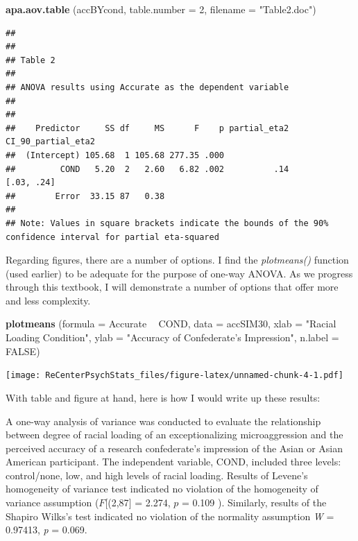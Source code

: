 \documentclass[
  english,
]{book}
\newenvironment{Shaded}{\begin{snugshade}}{\end{snugshade}}
\newcommand{\DataTypeTok}[1]{\textcolor[rgb]{0.13,0.29,0.53}{#1}}
\newcommand{\DecValTok}[1]{\textcolor[rgb]{0.00,0.00,0.81}{#1}}
\newcommand{\KeywordTok}[1]{\textcolor[rgb]{0.13,0.29,0.53}{\textbf{#1}}}
\newcommand{\NormalTok}[1]{#1}
\newcommand{\OperatorTok}[1]{\textcolor[rgb]{0.81,0.36,0.00}{\textbf{#1}}}
\newcommand{\OtherTok}[1]{\textcolor[rgb]{0.56,0.35,0.01}{#1}}
\newcommand{\StringTok}[1]{\textcolor[rgb]{0.31,0.60,0.02}{#1}}
\begin{document}
\begin{Shaded}
\begin{Highlighting}[]
\KeywordTok{apa.aov.table}\NormalTok{ (accBYcond, }\DataTypeTok{table.number =} \DecValTok{2}\NormalTok{, }\DataTypeTok{filename =} \StringTok{"Table2.doc"}\NormalTok{)}
\end{Highlighting}
\end{Shaded}

\begin{verbatim}
## 
## 
## Table 2 
## 
## ANOVA results using Accurate as the dependent variable
##  
## 
##    Predictor     SS df     MS      F    p partial_eta2 CI_90_partial_eta2
##  (Intercept) 105.68  1 105.68 277.35 .000                                
##         COND   5.20  2   2.60   6.82 .002          .14         [.03, .24]
##        Error  33.15 87   0.38                                            
## 
## Note: Values in square brackets indicate the bounds of the 90% confidence interval for partial eta-squared
\end{verbatim}

Regarding figures, there are a number of options. I find the \emph{plotmeans()} function (used earlier) to be adequate for the purpose of one-way ANOVA. As we progress through this textbook, I will demonstrate a number of options that offer more and less complexity.

\begin{Shaded}
\begin{Highlighting}[]
\KeywordTok{plotmeans}\NormalTok{ (}\DataTypeTok{formula =}\NormalTok{ Accurate }\OperatorTok{~}\StringTok{ }\NormalTok{COND, }\DataTypeTok{data =}\NormalTok{ accSIM30, }\DataTypeTok{xlab =} \StringTok{"Racial Loading Condition"}\NormalTok{, }\DataTypeTok{ylab =} \StringTok{"Accuracy of Confederate's Impression"}\NormalTok{, }\DataTypeTok{n.label =} \OtherTok{FALSE}\NormalTok{)}
\end{Highlighting}
\end{Shaded}

\texttt{[image: ReCenterPsychStats\_files/figure-latex/unnamed-chunk-4-1.pdf]}

With table and figure at hand, here is how I would write up these results:

A one-way analysis of variance was conducted to evaluate the relationship between degree of racial loading of an exceptionalizing microaggression and the perceived accuracy of a research confederate's impression of the Asian or Asian American participant. The independent variable, COND, included three levels: control/none, low, and high levels of racial loading. Results of Levene's homogeneity of variance test indicated no violation of the homogeneity of variance assumption (\(F\){[}(2,87{]} = 2.274, \(p\) = 0.109 ). Similarly, results of the Shapiro Wilks's test indicated no violation of the normality assumption \emph{W} = 0.97413, \emph{p} = 0.069.
\end{document}
